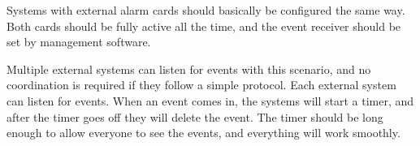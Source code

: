 Systems with external alarm cards should basically be configured the
same way.  Both cards should be fully active all the time, and the
event receiver should be set by management software.

Multiple external systems can listen for events with this scenario,
and no coordination is required if they follow a simple protocol.
Each external system can listen for events.  When an event comes in,
the systems will start a timer, and after the timer goes off they will
delete the event.  The timer should be long enough to allow everyone
to see the events, and everything will work smoothly.
